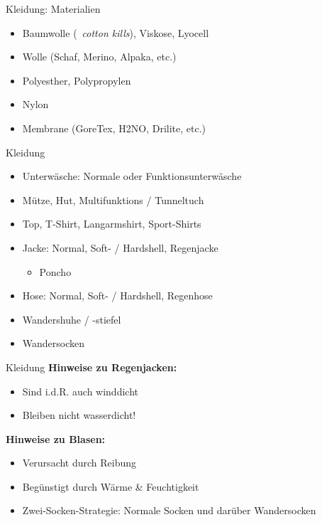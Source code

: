 \documentclass[aspectratio=169]{beamer}
\begin{document}
			\begin{frame}{Kleidung: Materialien}
				\begin{itemize}
					\item Baumwolle (\textrightarrow\ \textit{cotton kills}), Viskose, Lyocell
					\item Wolle (Schaf, Merino, Alpaka, etc.)
					\item Polyesther, Polypropylen
					\item Nylon
					\item Membrane (GoreTex, H2NO, Drilite, etc.)
				\end{itemize}
			\end{frame}
			
			\begin{frame}{Kleidung}
				\begin{itemize}
					\item Unterwäsche: Normale oder Funktionsunterwäsche
					\item Mütze, Hut, Multifunktions / Tunneltuch
					\item Top, T-Shirt, Langarmshirt, Sport-Shirts
					\item Jacke: Normal, Soft- / Hardshell, Regenjacke
					\begin{itemize}
						\item Poncho
					\end{itemize}
					\item Hose: Normal, Soft- / Hardshell, Regenhose
					\item Wandershuhe / -stiefel
					\item Wandersocken
				\end{itemize}
			\end{frame}
				
			\begin{frame}{Kleidung}
				\textbf{Hinweise zu Regenjacken:}
				\begin{itemize}
					\item Sind i.d.R. auch winddicht
					\item Bleiben nicht wasserdicht!
				\end{itemize}
				\pause
				\vspace{0.2cm}
				\textbf{Hinweise zu Blasen:}
				\begin{itemize}
					\item Verursacht durch Reibung
					\item Begünstigt durch Wärme \& Feuchtigkeit
					\item Zwei-Socken-Strategie: Normale Socken und darüber Wandersocken
				\end{itemize}
			\end{frame}
			
\end{document}
